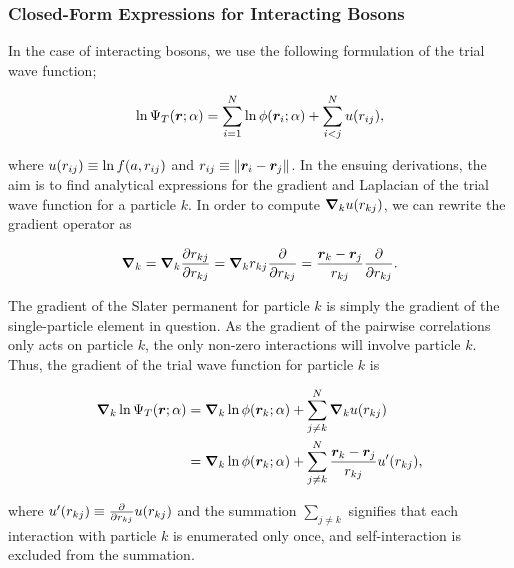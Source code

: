 \subsubsection{Closed-Form Expressions for Interacting Bosons}\label{sec:analytical_interact}

In the case of interacting bosons, we use the following formulation of the trial wave function;

\begin{equation*}
    \ln \Psi_T \qty(\bm{r}; \alpha) = \sum_{i=1}^N \ln \phi \qty(\bm{r}_i ; \alpha) + \sum_{i<j}^N u \qty(r_{ij}),
\end{equation*}

where $u \qty(r_{ij}) \equiv \ln f \qty(a, r_{ij})$ and $r_{ij} \equiv \norm{\bm{r}_i - \bm{r}_j}$. In the ensuing derivations, the aim is to find analytical expressions for the gradient and Laplacian of the trial wave function for a particle $k$. In order to compute $\grad_k u \qty(r_{kj})$, we can rewrite the gradient operator as 

\begin{equation*}
    \grad_k = \grad_k \pdv{r_{kj}}{r_{kj}} = \grad_k r_{kj} \pdv{r_{kj}} = \frac{\bm{r}_k - \bm{r}_j}{r_{kj}} \pdv{r_{kj}} .
\end{equation*}

The gradient of the Slater permanent for particle $k$ is simply the gradient of the single-particle element in question. As the gradient of the pairwise correlations only acts on particle $k$, the only non-zero interactions will involve particle $k$. Thus, the gradient of the trial wave function for particle $k$ is 

\begin{equation}
\begin{aligned}
    \grad_k \ln \Psi_T \qty(\bm{r}; \alpha) &= \grad_k \ln \phi \qty(\bm{r}_k; \alpha) + \sum_{j \neq k}^N \grad_k u \qty(r_{kj}) 
    \\
    &= \grad_k \ln \phi \qty(\bm{r}_k; \alpha) + \sum_{j \neq k}^N \frac{\bm{r}_k - \bm{r}_j}{r_{kj}} u' \qty(r_{kj}),
\end{aligned}
\end{equation} 

where $u' \qty(r_{kj}) \equiv \pdv{r_{kj}} u \qty(r_{kj})$ and the summation $\sum_{j\neq k}$ signifies that each interaction with particle $k$ is enumerated only once, and self-interaction is excluded from the summation. 

